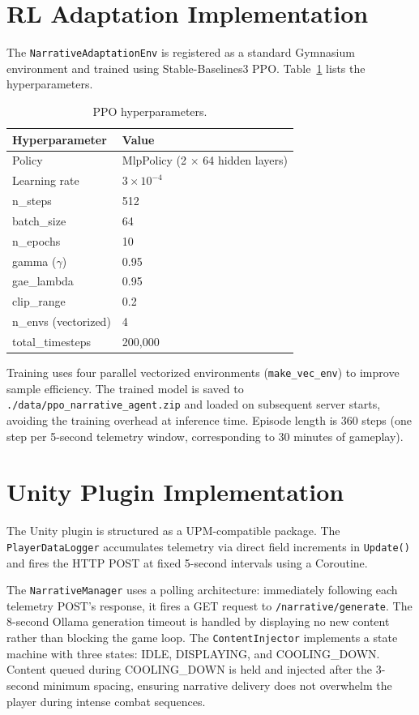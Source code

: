 \documentclass[12pt,a4paper]{report}
\begin{document}
\section{RL Adaptation Implementation}

The \texttt{NarrativeAdaptationEnv} is registered as a standard Gymnasium environment and trained using Stable-Baselines3 PPO. Table~\ref{tab:ppo_hyperparams} lists the hyperparameters.

\begin{table}[H]
\centering
\caption{PPO hyperparameters.}
\label{tab:ppo_hyperparams}
\small
\begin{tabular}{@{}ll@{}}
\toprule
\textbf{Hyperparameter} & \textbf{Value} \\
\midrule
Policy & MlpPolicy (2 $\times$ 64 hidden layers) \\
Learning rate & $3 \times 10^{-4}$ \\
n\_steps & 512 \\
batch\_size & 64 \\
n\_epochs & 10 \\
gamma ($\gamma$) & 0.95 \\
gae\_lambda & 0.95 \\
clip\_range & 0.2 \\
n\_envs (vectorized) & 4 \\
total\_timesteps & 200,000 \\
\bottomrule
\end{tabular}
\end{table}

Training uses four parallel vectorized environments (\texttt{make\_vec\_env}) to improve sample efficiency. The trained model is saved to \texttt{./data/ppo\_narrative\_agent.zip} and loaded on subsequent server starts, avoiding the training overhead at inference time. Episode length is 360 steps (one step per 5-second telemetry window, corresponding to 30 minutes of gameplay).

\section{Unity Plugin Implementation}

The Unity plugin is structured as a UPM-compatible package. The \texttt{PlayerDataLogger} accumulates telemetry via direct field increments in \texttt{Update()} and fires the HTTP POST at fixed 5-second intervals using a Coroutine.

The \texttt{NarrativeManager} uses a polling architecture: immediately following each telemetry POST's response, it fires a GET request to \texttt{/narrative/generate}. The 8-second Ollama generation timeout is handled by displaying no new content rather than blocking the game loop. The \texttt{ContentInjector} implements a state machine with three states: IDLE, DISPLAYING, and COOLING\_DOWN. Content queued during COOLING\_DOWN is held and injected after the 3-second minimum spacing, ensuring narrative delivery does not overwhelm the player during intense combat sequences.
\end{document}
